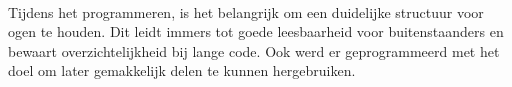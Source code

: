 \\
Tijdens het programmeren, is het belangrijk om een duidelijke structuur voor ogen te houden. Dit leidt immers tot goede leesbaarheid voor buitenstaanders en bewaart overzichtelijkheid bij lange code. Ook werd er geprogrammeerd met het doel om later gemakkelijk delen te kunnen hergebruiken.

